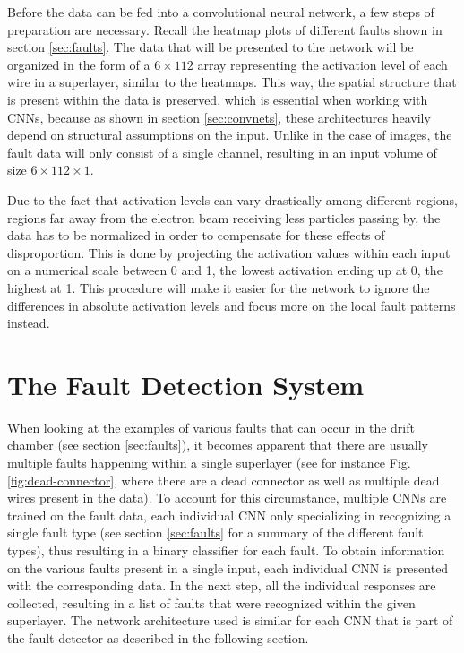 Before the data can be fed into a convolutional neural network, a few
steps of preparation are necessary. Recall the heatmap plots of
different faults shown in section \ref{sec:faults}. The data that will
be presented to the network will be organized in the form of a \(6
\times 112\) array representing the activation level of each wire in a
superlayer, similar to the heatmaps. This way, the spatial structure
that is present within the data is preserved, which is essential when
working with CNNs, because as shown in section \ref{sec:convnets},
these architectures heavily depend on structural assumptions on the
input. Unlike in the case of images, the fault data will only consist
of a single channel, resulting in an input volume of size \(6
\times 112 \times 1\).

Due to the fact that activation levels can vary drastically among
different regions, regions far away from the electron beam receiving
less particles passing by, the data has to be normalized in order to
compensate for these effects of disproportion. This is done by projecting
the activation values within each input on a numerical scale between 0
and 1, the lowest activation ending up at 0, the highest at 1. This
procedure will make it easier for the network to ignore the
differences in absolute activation levels and focus more on the local
fault patterns instead.

\section{The Fault Detection System}

When looking at the examples of various faults that can occur in the
drift chamber (see section \ref{sec:faults}), it becomes apparent that
there are usually multiple faults happening within a single
superlayer (see for instance Fig. \ref{fig:dead-connector}, where
there are a dead connector as well as multiple dead wires present in
the data). To account for this circumstance, multiple CNNs are
trained on the fault data, each individual CNN only specializing in
recognizing a single fault type (see section \ref{sec:faults} for a
summary of the different fault types), thus
resulting in a binary classifier for each fault. To obtain information
on the various faults present in a single input, each individual CNN
is presented with the corresponding data. In the next step, all the
individual responses are collected, resulting in a list of faults that
were recognized within the given superlayer. The network architecture
used is similar for each CNN that is part of the fault detector as
described in the following section.

